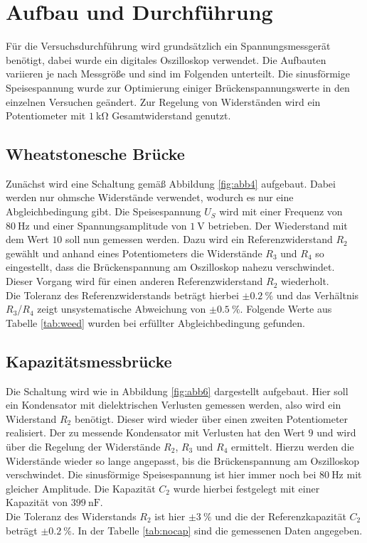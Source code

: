 \section{Aufbau und Durchführung}

Für die Versuchsdurchführung wird grundsätzlich ein Spannungsmessgerät benötigt, dabei wurde ein digitales Oszilloskop verwendet. Die Aufbauten variieren je nach Messgröße und sind
im Folgenden unterteilt. Die sinusförmige Speisespannung wurde zur Optimierung einiger Brückenspannungswerte in den einzelnen Versuchen geändert. Zur Regelung von Widerständen wird ein Potentiometer mit $\SI{1}{\kilo\ohm}$ Gesamtwiderstand 
genutzt.

\subsection{Wheatstonesche Brücke}
\label{sec:weedyo}
Zunächst wird eine Schaltung gemäß Abbildung \ref{fig:abb4} aufgebaut. Dabei werden nur ohmsche Widerstände verwendet, wodurch es nur eine Abgleichbedingung gibt. Die Speisespannung $U_{S}$ wird mit einer Frequenz von
$\SI{80}{\hertz}$ und einer Spannungsamplitude von $\SI{1}{\volt}$ betrieben. Der Wiederstand mit dem Wert $10$ soll nun gemessen werden. Dazu wird ein Referenzwiderstand $R_{2}$ gewählt und anhand eines Potentiometers die Widerstände 
$R_{3}$ und $R_{4}$ so eingestellt, dass die Brückenspannung am Oszilloskop nahezu verschwindet. Dieser Vorgang wird für einen anderen Referenzwiderstand $R_{2}$ wiederholt. 
\\
\newline
Die Toleranz des Referenzwiderstands beträgt hierbei $\pm\SI{0.2}{\percent}$ und das Verhältnis $R_{3}$/$R_{4}$ zeigt unsystematische Abweichung von $\pm\SI{0.5}{\percent}$.
Folgende Werte aus Tabelle \ref{tab:weed} wurden bei erfüllter Abgleichbedingung gefunden.

\subsection{Kapazitätsmessbrücke}
\label{sec:nocapyo}
Die Schaltung wird wie in Abbildung \ref{fig:abb6} dargestellt aufgebaut. Hier soll ein Kondensator mit dielektrischen Verlusten gemessen werden, also wird ein Widerstand $R_{2}$ benötigt. Dieser wird wieder über einen
zweiten Potentiometer realisiert. Der zu messende Kondensator mit 
Verlusten hat den Wert $9$ und wird über die Regelung der Widerstände $R_{2}$, $R_{3}$ und $R_{4}$ ermittelt. Hierzu werden die Widerstände wieder so lange angepasst, bis die Brückenspannung am Oszilloskop verschwindet.
Die sinusförmige Speisespannung ist hier immer noch bei $\SI{80}{\hertz}$ mit gleicher Amplitude. Die Kapazität $C_{2}$ wurde hierbei festgelegt mit einer Kapazität von $\SI{399}{\nano\farad}$.
\\
\newline
Die Toleranz des Widerstands $R_{2}$ ist hier $\pm\SI{3}{\percent}$ und die der Referenzkapazität $C_{2}$ beträgt $\pm\SI{0.2}{\percent}$.
In der Tabelle \ref{tab:nocap} sind die gemessenen Daten angegeben.

